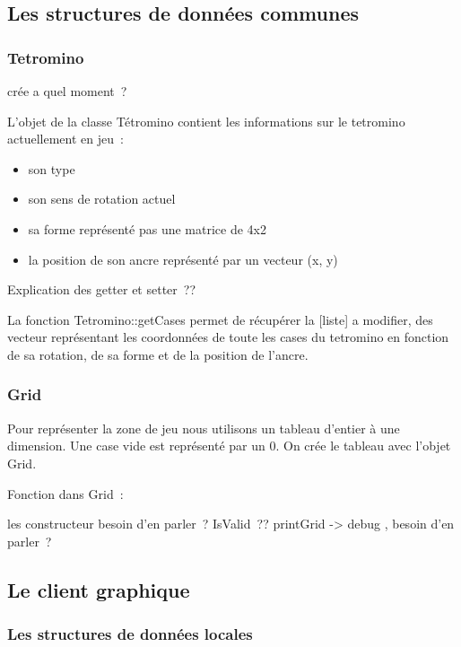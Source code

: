 \documentclass[a4paper, 12pt]{article}
\begin{document}
	
	\subsection{Les structures de données communes}

		\subsubsection{Tetromino}

			crée a quel moment ?

			L’objet de la classe Tétromino contient les informations sur le tetromino actuellement en jeu :
			\begin{itemize}
				\item son type
				\item son sens de rotation actuel
				\item sa forme représenté pas une matrice de 4x2
				\item la position de son ancre représenté par un vecteur (x, y)
			\end{itemize}

			Explication des getter et setter ??

			La fonction Tetromino::getCases permet de récupérer la [liste] a modifier, des vecteur représentant les coordonnées de toute les cases du tetromino en fonction de sa rotation, de sa forme et de la position de l’ancre.

		\subsubsection{Grid}
			Pour représenter la zone de jeu nous utilisons un tableau d’entier à une dimension. Une case vide est représenté par un 0. 
			On crée le tableau avec l’objet Grid.

			Fonction dans Grid :

			les constructeur besoin d’en parler ?
			IsValid ??
			printGrid -> debug , besoin d’en parler ?


	\subsection{Le client graphique}

		\subsubsection{Les structures de données locales}

\end{document}
